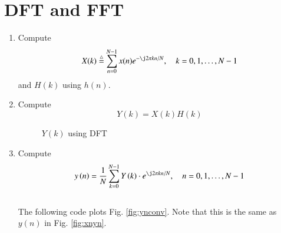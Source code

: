 \documentclass[journal,12pt,twocolumn]{IEEEtran}
\renewcommand\thesection{\arabic{section}}
\begin{document}
\section{DFT and FFT}
\begin{enumerate}[label=\thesection.\arabic*]
	\item
	Compute
	\begin{equation}
		X(k) \define \sum _{n=0}^{N-1}x(n) e^{-\j2\pi kn/N}, \quad k = 0,1,\dots, N-1
	\end{equation}
	and $H(k)$ using $h(n)$.\\
	\newline	\solution
	
	\item Compute 
	\begin{equation}
		Y(k) = X(k)H(k)
	\end{equation}
	\solution
	\begin{figure}[!ht]
		\centering
		\caption{$Y(k)$ using DFT}	
		\label{fig:Ykdft}
	\end{figure}
	\item Compute
	\begin{equation}
		y\brak{n}={\frac {1}{N}}\sum _{k=0}^{N-1}Y\brak{k}\cdot e^{\j 2\pi kn/N},\quad n = 0,1,\dots, N-1
	\end{equation}
	\\
	\solution The following code plots Fig. \ref{fig:ynconv}. Note that this is the same as 
	$y(n)$ in  Fig. 
	\ref{fig:xnyn}.
	

\end{enumerate}
\end{document}
